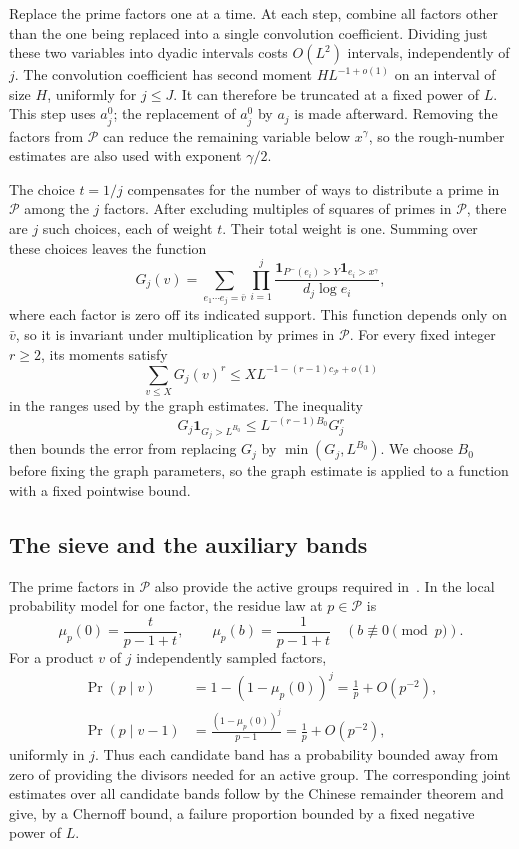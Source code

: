 \documentclass[10pt]{article}
\newcommand{\ind}{\mathbf 1}
\begin{document}
Replace the prime factors one at a time. At each step, combine all factors other than the one being replaced into a single convolution coefficient. Dividing just these two variables into dyadic intervals costs $O(L^2)$ intervals, independently of $j$. The convolution coefficient has second moment $HL^{-1+o(1)}$ on an interval of size $H$, uniformly for $j\leq J$. It can therefore be truncated at a fixed power of $L$. This step uses $a_j^0$; the replacement of $a_j^0$ by $a_j$ is made afterward. Removing the factors from $\mathcal P$ can reduce the remaining variable below $x^\gamma$, so the rough-number estimates are also used with exponent $\gamma/2$.

The choice $t=1/j$ compensates for the number of ways to distribute a prime in $\mathcal P$ among the $j$ factors. After excluding multiples of squares of primes in $\mathcal P$, there are $j$ such choices, each of weight $t$. Their total weight is one. Summing over these choices leaves the function
\[
 G_j(v)=\sum_{e_1\cdots e_j=\bar v}
       \prod_{i=1}^j
       \frac{\ind_{P^-(e_i)>Y}\ind_{e_i>x^\gamma}}{d_j\log e_i},
\]
where each factor is zero off its indicated support. This function depends only on $\bar v$, so it is invariant under multiplication by primes in $\mathcal P$. For every fixed integer $r\geq2$, its moments satisfy
\begin{equation}\label{eq:core-moment}
 \sum_{v\leq X}G_j(v)^r
 \leq X L^{-1-(r-1)c_{\mathcal P}+o(1)}
\end{equation}
in the ranges used by the graph estimates. The inequality
\[
 G_j\ind_{G_j>L^{B_0}}\leq L^{-(r-1)B_0}G_j^r
\]
then bounds the error from replacing $G_j$ by $\min(G_j,L^{B_0})$. We choose $B_0$ before fixing the graph parameters, so the graph estimate is applied to a function with a fixed pointwise bound.

\subsection{The sieve and the auxiliary bands}

The prime factors in $\mathcal P$ also provide the active groups required in~\cite[Section~6]{PD}. In the local probability model for one factor, the residue law at $p\in\mathcal P$ is
\[
 \mu_p(0)=\frac{t}{p-1+t},\qquad
 \mu_p(b)=\frac1{p-1+t}\quad(b\not\equiv0\pmod p).
\]
For a product $v$ of $j$ independently sampled factors,
\begin{align*}
 \Pr(p\mid v)&=1-(1-\mu_p(0))^j=\frac1p+O(p^{-2}),\\
 \Pr(p\mid v-1)&=\frac{(1-\mu_p(0))^j}{p-1}
                           =\frac1p+O(p^{-2}),
\end{align*}
uniformly in $j$. Thus each candidate band has a probability bounded away from zero of providing the divisors needed for an active group. The corresponding joint estimates over all candidate bands follow by the Chinese remainder theorem and give, by a Chernoff bound, a failure proportion bounded by a fixed negative power of $L$.
\end{document}
